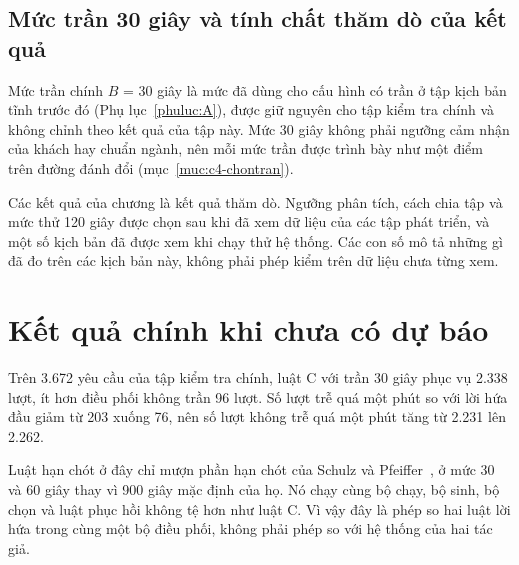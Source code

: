 \subsection{Mức trần 30 giây và tính chất thăm dò của kết quả}
\label{muc:c4-thamdo}

Mức trần chính $B$ = 30 giây là mức đã dùng cho cấu hình có trần ở tập kịch bản tĩnh trước đó
(Phụ lục~\ref{phuluc:A}), được giữ nguyên cho tập kiểm tra chính và không chỉnh theo kết quả của tập này.
Mức 30 giây không phải ngưỡng cảm nhận của khách hay chuẩn ngành, nên mỗi mức trần được trình bày như một
điểm trên đường đánh đổi (mục~\ref{muc:c4-chontran}).

Các kết quả của chương là kết quả thăm dò. Ngưỡng phân tích, cách chia tập và mức thử 120 giây được chọn
sau khi đã xem dữ liệu của các tập phát triển, và một số kịch bản đã được xem khi chạy thử hệ thống. Các
con số mô tả những gì đã đo trên các kịch bản này, không phải phép kiểm trên dữ liệu chưa từng xem.

\section{Kết quả chính khi chưa có dự báo}
\label{muc:c4-ketqua}

Trên 3.672 yêu cầu của tập kiểm tra chính, luật C với trần 30 giây phục vụ 2.338 lượt, ít hơn điều phối
không trần 96 lượt. Số lượt trễ quá một phút so với lời hứa đầu giảm từ 203 xuống 76, nên số lượt không
trễ quá một phút tăng từ 2.231 lên 2.262.

Luật hạn chót ở đây chỉ mượn phần hạn chót của Schulz và Pfeiffer~\cite{schulz2026}, ở mức 30 và 60 giây
thay vì 900 giây mặc định của họ. Nó chạy cùng bộ chạy, bộ sinh, bộ chọn và luật phục hồi không tệ hơn
như luật C. Vì vậy đây là phép so hai luật lời hứa trong cùng một bộ điều phối, không phải phép so với hệ
thống của hai tác giả.

